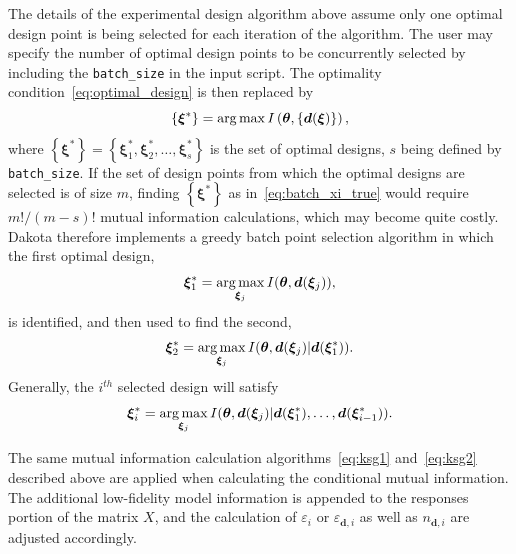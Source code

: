 The details of the experimental design algorithm above assume only one
optimal design point is being selected for each iteration of the algorithm.
The user may specify the number of optimal design points to be
concurrently selected by including the \texttt{batch\_size} in the input
script. The optimality condition~\ref{eq:optimal_design} is then replaced by
\begin{equation}
\left\{ \boldsymbol{\xi}^{*} \right\} = \operatorname*{arg\,max} I\left(\boldsymbol{\theta}, 
\left\{ \boldsymbol{d}(\boldsymbol{\xi})\right\}\right),
\label{eq:batch_xi_true}
\end{equation} 
where $\left\{ \boldsymbol{\xi}^{*} \right\} = \left\{ \boldsymbol{\xi}^{*}_{1},
\boldsymbol{\xi}_{2}^{*}, \ldots, \boldsymbol{\xi}_{s}^{*} \right\}$ is the 
set of optimal designs, $s$ being defined by \texttt{batch\_size}. If the set
of design points from which the optimal designs are selected is of size $m$,
finding $\left\{ \boldsymbol{\xi}^{*} \right\}$ as in~\ref{eq:batch_xi_true}
would require $m!/(m-s)!$ mutual information calculations, which may become
quite costly. Dakota therefore implements a greedy batch point selection
algorithm in which the first optimal design,
\begin{equation}
\boldsymbol{\xi}^{*}_{1} = \operatorname*{arg\,max}_{\boldsymbol{\xi}_{j}} I(\boldsymbol{\theta},
\boldsymbol{d}(\boldsymbol{\xi}_{j}) ),
\end{equation} 
is identified, and then used to find the second,
\begin{equation}
\boldsymbol{\xi}^{*}_{2} = \operatorname*{arg\,max}_{\boldsymbol{\xi}_{j}} 
I(\boldsymbol{\theta}, \boldsymbol{d}(\boldsymbol{\xi}_{j}) |
\boldsymbol{d}(\boldsymbol{\xi}_{1}^{*})).
\end{equation} 
Generally, the $i^{th}$ selected design will satisfy
\begin{equation}
\boldsymbol{\xi}^{*}_{i} = \operatorname*{arg\,max}_{\boldsymbol{\xi}_{j}} 
I(\boldsymbol{\theta}, \boldsymbol{d}(\boldsymbol{\xi}_{j}) |
\boldsymbol{d}(\boldsymbol{\xi}_{1}^{*}), \ldots, 
\boldsymbol{d}(\boldsymbol{\xi}_{i-1}^{*})).
\end{equation} 

The same mutual information calculation algorithms~\ref{eq:ksg1} 
and~\ref{eq:ksg2} described above are applied when calculating the conditional
mutual information. The additional low-fidelity model information is 
appended to the responses portion of the matrix $X$, and the calculation of
$\varepsilon_{i}$ or $\varepsilon_{\boldsymbol{d}, i}$ as well as 
$n_{\boldsymbol{d}, i}$ are adjusted accordingly.  

